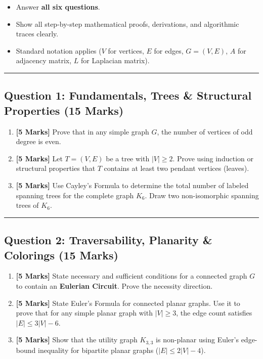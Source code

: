\documentclass[
]{book}
\providecommand{\tightlist}{%
  \setlength{\itemsep}{0pt}\setlength{\parskip}{0pt}}
\theoremstyle{definition}
\theoremstyle{definition}
\theoremstyle{definition}
\theoremstyle{definition}
\theoremstyle{remark}
\begin{document}
\begin{itemize}
\tightlist
\item
  Answer \textbf{all six questions}.
\item
  Show all step-by-step mathematical proofs, derivations, and algorithmic traces clearly.
\item
  Standard notation applies (\(V\) for vertices, \(E\) for edges, \(G=(V,E)\), \(A\) for adjacency matrix, \(L\) for Laplacian matrix).
\end{itemize}

\begin{center}\rule{0.5\linewidth}{0.5pt}\end{center}

\subsection{Question 1: Fundamentals, Trees \& Structural Properties (15 Marks)}\label{question-1-fundamentals-trees-structural-properties-15-marks}

\begin{enumerate}
\def\labelenumi{\arabic{enumi}.}
\tightlist
\item
  \textbf{{[}5 Marks{]}} Prove that in any simple graph \(G\), the number of vertices of odd degree is even.
\item
  \textbf{{[}5 Marks{]}} Let \(T = (V, E)\) be a tree with \(\vert{}V\vert{} \ge 2\). Prove using induction or structural properties that \(T\) contains at least two pendant vertices (leaves).
\item
  \textbf{{[}5 Marks{]}} Use Cayley's Formula to determine the total number of labeled spanning trees for the complete graph \(K_6\). Draw two non-isomorphic spanning trees of \(K_6\).
\end{enumerate}

\begin{center}\rule{0.5\linewidth}{0.5pt}\end{center}

\subsection{Question 2: Traversability, Planarity \& Colorings (15 Marks)}\label{question-2-traversability-planarity-colorings-15-marks}

\begin{enumerate}
\def\labelenumi{\arabic{enumi}.}
\tightlist
\item
  \textbf{{[}5 Marks{]}} State necessary and sufficient conditions for a connected graph \(G\) to contain an \textbf{Eulerian Circuit}. Prove the necessity direction.
\item
  \textbf{{[}5 Marks{]}} State Euler's Formula for connected planar graphs. Use it to prove that for any simple planar graph with \(\vert{}V\vert{} \ge 3\), the edge count satisfies \(\vert{}E\vert{} \le 3\vert{}V\vert{} - 6\).
\item
  \textbf{{[}5 Marks{]}} Show that the utility graph \(K_{3,3}\) is non-planar using Euler's edge-bound inequality for bipartite planar graphs (\(\vert{}E\vert{} \le 2\vert{}V\vert{} - 4\)).
\end{enumerate}
\end{document}
